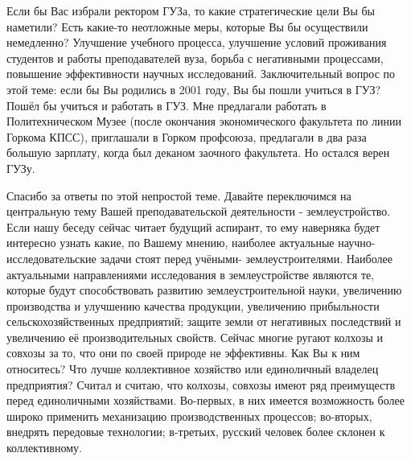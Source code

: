 \begin{drama}
	\maxspeaks Если бы Вас избрали ректором ГУЗа, то какие стратегические цели Вы бы наметили? Есть какие-то неотложные меры, которые Вы бы осуществили немедленно?
	\michaelspeaks Улучшение учебного процесса, улучшение условий проживания студентов и работы преподавателей вуза, борьба с негативными процессами, повышение эффективности научных исследований.
	\maxspeaks Заключительный вопрос по этой теме: если бы Вы родились в 2001 году, Вы бы пошли учиться в ГУЗ?
	\michaelspeaks Пошёл бы учиться и работать в ГУЗ. Мне предлагали работать в Политехническом Музее (после окончания экономического факультета по линии Горкома КПСС), приглашали в Горком профсоюза, предлагали в два раза большую зарплату, когда был деканом заочного факультета. Но остался верен ГУЗу.

	\maxspeaks Спасибо за ответы по этой непростой теме. Давайте переключимся на центральную тему Вашей преподавательской деятельности - землеустройство.
Если нашу беседу сейчас читает будущий аспирант, то ему наверняка будет интересно узнать какие, по Вашему мнению, наиболее актуальные научно-исследовательские задачи стоят перед учёными- землеустроителями.
	\michaelspeaks Наиболее актуальными направлениями исследования в землеустройстве являются те, которые будут способствовать развитию землеустроительной науки, увеличению производства и улучшению качества продукции, увеличению прибыльности сельскохозяйственных предприятий; защите земли от негативных последствий и увеличению её производительных свойств.
	\maxspeaks Сейчас многие ругают колхозы и совхозы за то, что они по своей природе не эффективны. Как Вы к ним относитесь? Что лучше коллективное хозяйство или единоличный владелец предприятия?
	\michaelspeaks Считал и считаю, что колхозы, совхозы имеют ряд преимуществ перед единоличными хозяйствами. Во-первых, в них имеется возможность более широко применить механизацию производственных процессов; во-вторых, внедрять передовые технологии; в-третьих, русский человек более склонен к коллективному.



\end{drama}
